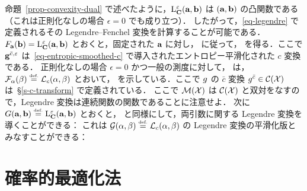 \begin{rem}
	命題~\ref{prop-convexity-dual} で述べたように，$\MKD_\C^\epsilon(\a,\b)$ は $(\a,\b)$ の凸関数である（これは正則化なしの場合 $\epsilon=0$ でも成り立つ）．
	したがって，\eqref{eq-legendre} で定義されるその Legendre--Fenchel 変換を計算することが可能である．
	$F_\a(\b) = \MKD_\C^\epsilon(\a,\b)$ とおくと，固定された $\a$ に対し，\citet{2016-Cuturi-siims} に従って，
	を得る．ここで $\gD^{\bar\c,\epsilon}$ は~\eqref{eq-entropic-smoothed-c} で導入されたエントロピー平滑化された $c$ 変換である．
	正則化なしの場合 $\epsilon=0$ かつ一般の測度に対して，\citet{Carlier-NumericsBarycenters} は，$\Ff_\al(\be) \eqdef \MK_\c(\al,\be)$ とおいて，
	を示している．ここで $\g$ の $\bar c$ 変換 $\g^{\bar c} \in \Cc(\X)$ は~\S\ref{s-c-transform} で定義されている．
	ここで $\Mm(\X)$ は $\Cc(\X)$ と双対をなすので，Legendre 変換は連続関数の関数であることに注意せよ．
	次に $G(\a,\b) \eqdef \MKD_\C^\epsilon(\a,\b)$ とおくと，\citep{2016-Cuturi-siims,cuturi2018semidual} と同様にして，両引数に関する Legendre 変換を導くことができる：
	これは $\Gg(\al,\be) \eqdef \MK_\c(\al,\be)$ の Legendre 変換の平滑化版とみなすことができる：
\end{rem}



\section{確率的最適化法}
\label{sec-sgd}

